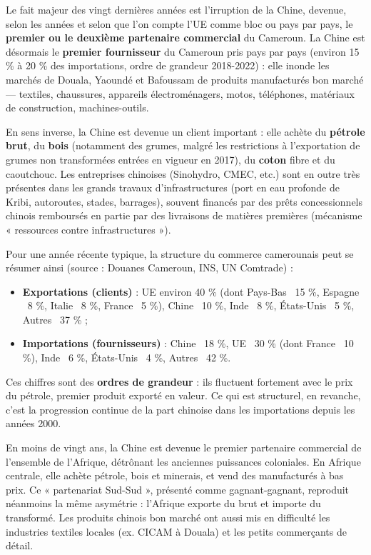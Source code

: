 \documentclass[11pt]{article}
\newcommand{\cle}[1]{{\popxbold\color{popdark}#1}}
\newcounter{popsec}
\newcounter{popsub}
\newcommand{\courssub}[1]{%
  \stepcounter{popsub}%
  \par\vspace{9pt}\noindent{\popxbold\fontsize{11.5}{13}\selectfont\color{popink}{\color{poporange}\thepopsec.\thepopsub}\hspace{6pt}#1}\par\nopagebreak\vspace{4pt}
}
\begin{document}
\courssub{La montée en puissance de la Chine}

Le fait majeur des vingt dernières années est l'irruption de la \cle{Chine}, devenue, selon les années et selon que l'on compte l'UE comme bloc ou pays par pays, le \textbf{premier ou le deuxième partenaire commercial} du Cameroun. La Chine est désormais le \textbf{premier fournisseur} du Cameroun pris pays par pays (environ 15 \% à 20 \% des importations, ordre de grandeur 2018-2022) : elle inonde les marchés de Douala, Yaoundé et Bafoussam de produits manufacturés bon marché — textiles, chaussures, appareils électroménagers, motos, téléphones, matériaux de construction, machines-outils.

En sens inverse, la Chine est devenue un client important : elle achète du \textbf{pétrole brut}, du \textbf{bois} (notamment des grumes, malgré les restrictions à l'exportation de grumes non transformées entrées en vigueur en 2017), du \textbf{coton} fibre et du caoutchouc. Les entreprises chinoises (Sinohydro, CMEC, etc.) sont en outre très présentes dans les grands travaux d'infrastructures (port en eau profonde de Kribi, autoroutes, stades, barrages), souvent financés par des prêts concessionnels chinois remboursés en partie par des livraisons de matières premières (mécanisme « ressources contre infrastructures »).

\begin{exemplebox}
Pour une année récente typique, la structure du commerce camerounais peut se résumer ainsi (source : Douanes Cameroun, INS, UN Comtrade) :
\begin{itemize}
\item \textbf{Exportations (clients)} : UE environ 40 \% (dont Pays-Bas ~15 \%, Espagne ~8 \%, Italie ~8 \%, France ~5 \%), Chine ~10 \%, Inde ~8 \%, États-Unis ~5 \%, Autres ~37 \% ;
\item \textbf{Importations (fournisseurs)} : Chine ~18 \%, UE ~30 \% (dont France ~10 \%), Inde ~6 \%, États-Unis ~4 \%, Autres ~42 \%.
\end{itemize}
Ces chiffres sont des \textbf{ordres de grandeur} : ils fluctuent fortement avec le prix du pétrole, premier produit exporté en valeur. Ce qui est structurel, en revanche, c'est la progression continue de la part chinoise dans les importations depuis les années 2000.
\end{exemplebox}

\begin{savaistu}
En moins de vingt ans, la Chine est devenue le premier partenaire commercial de l'ensemble de l'Afrique, détrônant les anciennes puissances coloniales. En Afrique centrale, elle achète pétrole, bois et minerais, et vend des manufacturés à bas prix. Ce « partenariat Sud-Sud », présenté comme gagnant-gagnant, reproduit néanmoins la même asymétrie : l'Afrique exporte du brut et importe du transformé. Les produits chinois bon marché ont aussi mis en difficulté les industries textiles locales (ex. CICAM à Douala) et les petits commerçants de détail.
\end{savaistu}
\end{document}
